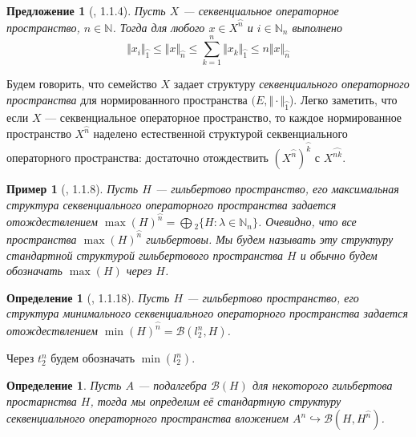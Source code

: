 \documentclass[12pt]{article}
\newtheorem{proposition}[theorem]{Предложение}
\newtheorem{definition}[theorem]{Определение}
\newtheorem{example}[theorem]{Пример}
\begin{document}
\begin{proposition}[\cite{LamOpFolgen}, 1.1.4]\label{PrNormVsSQNorm} Пусть $X$ --- секвенциальное операторное пространство, $n\in\mathbb{N}$. Тогда для любого $x\in X^{\wideparen{n}}$ и $i\in\mathbb{N}_n$ выполнено
$$
\Vert x_i\Vert_{\wideparen{1}}\leq\Vert x\Vert_{\wideparen{n}}\leq\sum\limits_{k=1}^n\Vert x_k\Vert_{\wideparen{1}}\leq n\Vert x\Vert_{\wideparen{n}}
$$
\end{proposition}


Будем говорить, что семейство $X$ задает структуру \textit{секвенциального операторного пространства} для нормированного пространства $(E, \Vert \cdot \Vert_{\wideparen{1}}$). Легко заметить, что если $X$ --- секвенциальное операторное пространство, то каждое 
нормированное пространство $X^{\wideparen{n}}$ наделено естественной структурой секвенциального операторного пространства: достаточно отождествить $(X^{\wideparen{n}})^{\wideparen{k}}$ с $X^{\wideparen{nk}}$.

\begin{example}[\cite{LamOpFolgen}, 1.1.8]\label{ExHilSQ} Пусть $H$ --- гильбертово пространство, его максимальная структура секвенциального операторного пространства задается отождествлением $\max(H)^{\wideparen{n}}=\bigoplus{}_2\{H:\lambda\in\mathbb{N}_n\}$. Очевидно, что все пространства $\max(H)^{\wideparen{n}}$ гильбертовы. Мы будем называть эту структуру стандартной структурой гильбертового пространства $H$ и обычно будем обозначать $\max(H)$ через $H$.
\end{example}

\begin{definition}[\cite{LamOpFolgen}, 1.1.18]\label{ExT2nSQ} 
Пусть $H$ --- гильбертово пространство, его структура минимального секвенциального операторного пространства задается отождествлением $\min(H)^{\wideparen{n}} = \mathcal{B}(l_2^n, H)$. 
\end{definition}

Через $t_2^n$ будем обозначать $\min(l_2^n)$.

\begin{definition}\label{DefOpSubAlgSQ} Пусть $A$ --- подалгебра $\mathcal{B}(H)$ для некоторого гильбертова простарнства $H$, тогда мы определим её стандартную структуру секвенциального операторного пространства вложением $A^n\hookrightarrow \mathcal{B}(H,H^{\wideparen{n}})$.
\end{definition}
\end{document}
